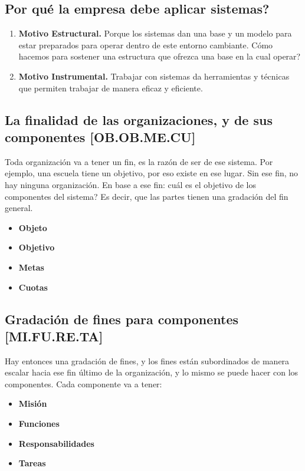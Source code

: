 \hypertarget{por-quuxe9-la-empresa-debe-aplicar-sistemas}{%
\subsection{Por qué la empresa debe aplicar
sistemas?}\label{por-quuxe9-la-empresa-debe-aplicar-sistemas}}

\begin{enumerate}
\def\labelenumi{\arabic{enumi}.}
\item
  \textbf{Motivo Estructural.} Porque los sistemas dan una base y un modelo para
  estar preparados para operar dentro de este entorno cambiante. Cómo
  hacemos para sostener una estructura que ofrezca una base en la cual
  operar?
\item
  \textbf{Motivo Instrumental.} Trabajar con sistemas da herramientas y técnicas
  que permiten trabajar de manera eficaz y eficiente.
\end{enumerate}

\hypertarget{la-finalidad-de-las-organizaciones-y-de-sus-componentes-ob.ob.me.cu}{%
\subsection{La finalidad de las organizaciones, y de sus componentes
{[}OB.OB.ME.CU{]}}\label{la-finalidad-de-las-organizaciones-y-de-sus-componentes-ob.ob.me.cu}}

Toda organización va a tener un fin, es la razón de ser de ese sistema.
Por ejemplo, una escuela tiene un objetivo, por eso existe en ese lugar.
Sin ese fin, no hay ninguna organización. En base a ese fin: cuál es el
objetivo de los componentes del sistema? Es decir, que las partes tienen
una gradación del fin general. 
\begin{itemize}
\item \textbf{Objeto} 
\item \textbf{Objetivo} 
\item \textbf{Metas} 
\item \textbf{Cuotas}
\end{itemize}

\hypertarget{gradaciuxf3n-de-fines-para-componentes-mi.fu.re.ta}{%
\subsection{Gradación de fines para componentes
{[}MI.FU.RE.TA{]}}\label{gradaciuxf3n-de-fines-para-componentes-mi.fu.re.ta}}

Hay entonces una gradación de fines, y los fines están subordinados de
manera escalar hacia ese fin último de la organización, y lo mismo se
puede hacer con los componentes. Cada componente va a tener: 
\begin{itemize}
\item \textbf{Misión} 
\item \textbf{Funciones} 
\item \textbf{Responsabilidades} 
\item \textbf{Tareas}
\end{itemize}

